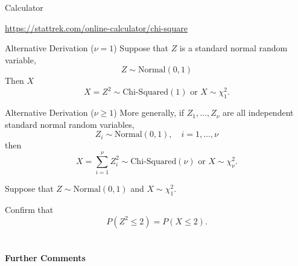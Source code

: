 \begin{frame}

\begin{block}{Calculator}

\begin{center}
\url{https://stattrek.com/online-calculator/chi-square}
\end{center}
\end{block}
\end{frame}

\begin{frame}
  \begin{block}{Alternative Derivation ($\nu = 1$)}
    Suppose that $Z$ is a standard normal random variable,
    \[
      Z \sim \mbox{Normal}(0,1)
    \]
    Then $X$ 
    \[
      X=Z^2 \sim \mbox{Chi-Squared}(1) \mbox{ or } X \sim \chi^2_1.
    \]
  \end{block}
\end{frame}

\begin{frame}
  \begin{block}{Alternative Derivation ($\nu \geq 1$)}
    More generally, if $Z_1,\ldots,Z_\nu$ are all independent standard normal random variables,
    \[
      Z_i \sim \mbox{Normal}(0,1), \quad i=1,\ldots,\nu
    \]
    then
    \[
      X=\sum_{i=1}^\nu Z_i^2 \sim \mbox{Chi-Squared}(\nu) \mbox{ or } X \sim \chi^2_\nu.
    \]
    
  \end{block}
\end{frame}

\begin{frame}

  \begin{block}{\example}
    Suppose that $Z \sim \mbox{Normal}(0,1)$ and $X \sim \chi^2_1$.

    \bigskip

    Confirm that
    \[
      P(Z^2 \leq 2) = P(X \leq 2).
    \]
    
  \end{block}
\end{frame}
\section{}

\begin{frame}
  
  \begin{center}
    \Large{\textbf{Further Comments}}
  \end{center}
  
  \bigskip
  
\end{frame}

